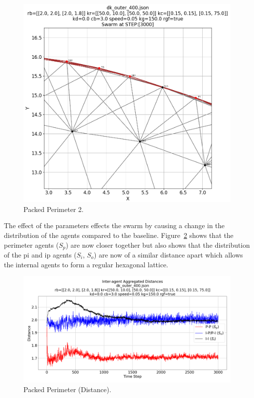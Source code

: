 \documentclass[12pt,a4paper]{IEEEtran}
\begin{document}
\begin{figure}[H]
	\begin{center}
		\includegraphics[width=1.0\linewidth]{figures/outer2}
	\end{center}
	\caption{Packed Perimeter 2. \label{fig:tightPerim2}}
\end{figure}

The effect of the parameters effects the swarm by causing a change in the distribution of the agents compared to the baseline. Figure~\ref{fig:tightPerimDistance} shows that the perimeter agents ($S_{p}$) are now closer together but also shows that the distribution of the p\textrightarrow i and i\textrightarrow p agents ($S_{i}$, $S_{o}$) are now of a similar distance apart which allows the internal agents to form a regular hexagonal lattice.

\begin{figure}[H]
	\begin{center}
		\includegraphics[width=1.0\linewidth]{figures/outerDistance}
	\end{center}
	\caption{Packed Perimeter (Distance). \label{fig:tightPerimDistance}}
\end{figure}
\end{document}
